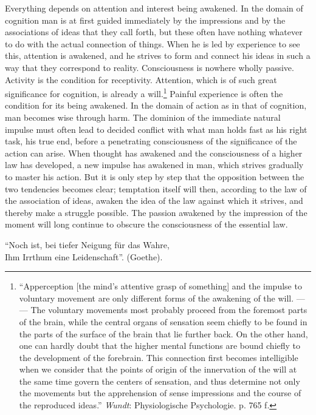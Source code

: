 \documentclass[12pt,a4paper,openany]{book}
\newcommand{\opage}[1]{\marginnote{\footnotesize\textit{[#1]}}}
\begin{document}
Everything depends on attention and interest being awakened. In the domain of
cognition man is at first guided immediately by the impressions and by the
associations of ideas that they call forth, but these often have nothing
whatever to do with the \opage{121}actual connection of things. When he is led
by experience to see this, attention is awakened, and he strives to form and
connect his ideas in such a way that they correspond to reality. Consciousness
is nowhere wholly passive. Activity is the condition for receptivity.
Attention, which is of such great significance for cognition, is already a
will.\footnote[1]{``Apperception [the mind's attentive grasp of something] and
the impulse to voluntary movement are only different forms of the awakening of
the will. --- --- The voluntary movements most probably proceed from the
foremost parts of the brain, while the central organs of sensation seem
chiefly to be found in the parts of the surface of the brain that lie further
back. On the other hand, one can hardly doubt that the higher mental functions
are bound chiefly to the development of the forebrain. This connection first
becomes intelligible when we consider that the points of origin of the
innervation of the will at the same time govern the centers of sensation, and
thus determine not only the movements but the apprehension of sense
impressions and the course of the reproduced ideas.'' \emph{Wundt}:
Physiologische Psychologie. p. 765 f.} Painful experience is often the
condition for its being awakened. In the domain of action as in that of
cognition, man becomes wise through harm. The dominion of the immediate
natural impulse must often lead to decided conflict with what man holds fast
as his right task, his true end, before a penetrating consciousness of the
significance of the action can arise. When thought has awakened and the
consciousness of a higher law has developed, a new impulse has awakened in
man, which strives gradually to master \opage{122}his action. But it is only
step by step that the opposition between the two tendencies becomes clear;
temptation itself will then, according to the law of the association of ideas,
awaken the idea of the law against which it strives, and thereby make a
struggle possible. The passion awakened by the impression of the moment will
long continue to obscure the consciousness of the essential law.

``Noch ist, bei tiefer Neigung für das Wahre,\\
Ihm Irrthum eine Leidenschaft''. (Goethe).
\end{document}
